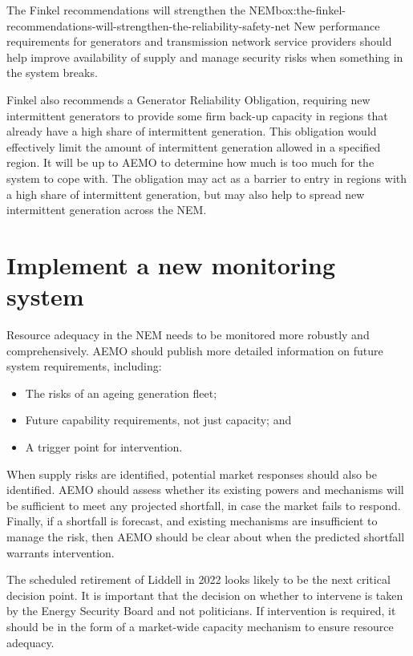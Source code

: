 \documentclass[FrontPage]{grattan}
\newenvironment{alphafootnotes}{}{}
\begin{document}
\begin{bigbox*}{The Finkel recommendations will strengthen the NEM}{box:the-finkel-recommendations-will-strengthen-the-reliability-safety-net}
\begin{alphafootnotes}
New performance requirements for generators and transmission network service providers should help improve availability of supply and manage security risks when something in the system breaks.

Finkel also recommends a Generator Reliability Obligation, requiring new intermittent generators to provide some firm back-up capacity in regions that already have a high share of intermittent generation. This obligation would effectively limit the amount of intermittent generation allowed in a specified region. It will be up to AEMO to determine how much is too much for the system to cope with. The obligation may act as a barrier to entry in regions with a high share of intermittent generation, but may also help to spread new intermittent generation across the NEM\@.
\end{alphafootnotes}
\end{bigbox*}


\section{Implement a new monitoring system}\label{sec:implement-new-monitoring-system}
Resource adequacy in the NEM needs to be monitored more robustly and comprehensively. AEMO should publish more detailed information on future system requirements, including:
\begin{itemize}
    \item The risks of an ageing generation fleet;
    \item Future capability requirements, not just capacity; and
    \item A trigger point for intervention.
\end{itemize}

When supply risks are identified, potential market responses should also be identified. AEMO should assess whether its existing powers and mechanisms will be sufficient to meet any projected shortfall, in case the market fails to respond. Finally, if a shortfall is forecast, and existing mechanisms are insufficient to manage the risk, then AEMO should be clear about when the predicted shortfall warrants intervention.

The scheduled retirement of Liddell in 2022 looks likely to be the next critical decision point. It is important that the decision on whether to intervene is taken by the Energy Security Board and not politicians. If intervention is required, it should be in the form of a market-wide capacity mechanism to ensure resource adequacy.
\end{document}
